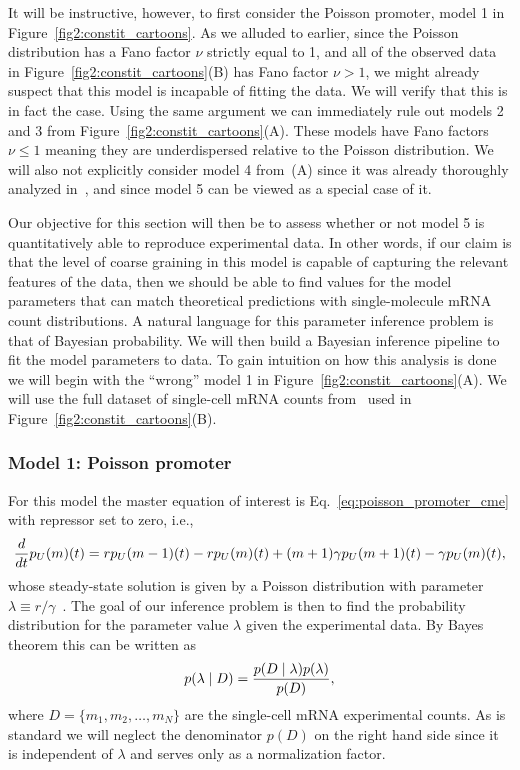 It will be instructive, however, to first consider the Poisson promoter, model 1
in Figure~\ref{fig2:constit_cartoons}. As we alluded to earlier, since the
Poisson distribution has a Fano factor $\nu$ strictly equal to 1, and all of the
observed data in Figure~\ref{fig2:constit_cartoons}(B) has Fano factor $\nu>1$,
we might already suspect that this model is incapable of fitting the data. We
will verify that this is in fact the case. Using the same argument we can
immediately rule out models 2 and 3 from Figure~\ref{fig2:constit_cartoons}(A).
These models have Fano factors $\nu\le 1$ meaning they are underdispersed
relative to the Poisson distribution. We will also not explicitly consider model
4 from~(A) since it was already thoroughly analyzed
in~\cite{Razo-Mejia2020}, and since model 5 can be viewed as a special case of
it.

Our objective for this section will then be to assess whether or not model 5 is
quantitatively able to reproduce experimental data. In other words, if our claim
is that the level of coarse graining in this model is capable of capturing the
relevant features of the data, then we should be able to find values for the
model parameters that can match theoretical predictions with single-molecule
mRNA count distributions. A natural language for this parameter inference
problem is that of Bayesian probability. We will then build a Bayesian inference
pipeline to fit the model parameters to data. To gain intuition on how this
analysis is done we will begin with the ``wrong'' model 1 in
Figure~\ref{fig2:constit_cartoons}(A). We will use the full dataset of
single-cell mRNA counts from~\cite{Jones2014} used in
Figure~\ref{fig2:constit_cartoons}(B).

\subsubsection{Model 1: Poisson promoter}

For this model the master equation of interest is
Eq.~\ref{eq:poisson_promoter_cme} with repressor set to zero, i.e.,
\begin{equation}
{d\over dt}p_U(m)(t) = 
        rp_U(m-1)(t) 
        - rp_U(m)(t)
        + (m+1)\gamma p_U(m+1)(t) 
        - \gamma p_U(m)(t),
\end{equation}
whose steady-state solution is given by a Poisson distribution with parameter
$\lambda \equiv r / \gamma$~\cite{Sanchez2013}. The goal of our inference 
problem is then to find the probability distribution for the parameter value
$\lambda$ given the experimental data. By Bayes theorem this can be written as
\begin{equation}
p(\lambda \mid D) = {p(D \mid \lambda) p(\lambda) \over p(D)},
\end{equation}
where $D = \{m_1, m_2, \ldots, m_N \}$ are the single-cell mRNA experimental
counts. As is standard we will neglect the denominator $p(D)$ on the right
hand side since it is independent of $\lambda$ and serves only as a
normalization factor.


